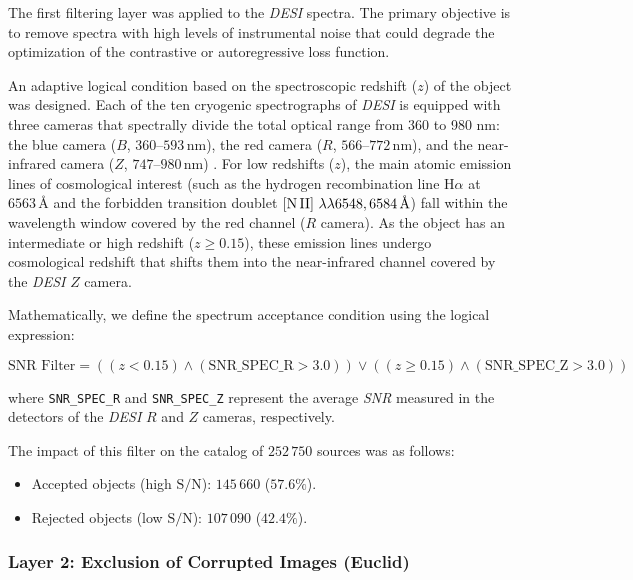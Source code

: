 The first filtering layer was applied to the \textit{\gls{DESI}} spectra. The primary objective is to remove spectra with high levels of instrumental noise that could degrade the optimization of the contrastive or autoregressive loss function.

An adaptive logical condition based on the spectroscopic redshift ($z$) of the object was designed. Each of the ten cryogenic spectrographs of \textit{\gls{DESI}} is equipped with three cameras that spectrally divide the total optical range from 360 to 980 nm: the blue camera ($B$, $360\text{--}593\,\text{nm}$), the red camera ($R$, $566\text{--}772\,\text{nm}$), and the near-infrared camera ($Z$, $747\text{--}980\,\text{nm}$) \autocite{ar:abareshi-2022}. For low redshifts ($z$), the main atomic emission lines of cosmological interest (such as the hydrogen recombination line H$\alpha$ at $6563\,\text{\AA{}}$ and the forbidden transition doublet $\left[\text{N\,II}\right]\,\lambda\lambda 6548, 6584\,\text{\AA{}}$) fall within the wavelength window covered by the red channel ($R$ camera). As the object has an intermediate or high redshift ($z \ge 0.15$), these emission lines undergo cosmological redshift that shifts them into the near-infrared channel covered by the \textit{DESI} $Z$ camera.

Mathematically, we define the spectrum acceptance condition using the logical expression:

\begin{equation}
\text{SNR Filter} = \left( \left(z < 0.15\right) \wedge \left(\text{SNR\_SPEC\_R} > 3.0\right) \right) \vee \left( \left(z \ge 0.15\right) \wedge \left(\text{SNR\_SPEC\_Z} > 3.0\right) \right)
\label{eq:filtro_snr}
\end{equation}

where \texttt{SNR\_SPEC\_R} and \texttt{SNR\_SPEC\_Z} represent the average \textit{\gls{SNR}} measured in the detectors of the \textit{\gls{DESI}} $R$ and $Z$ cameras, respectively.

The impact of this filter on the catalog of $252\,750$ sources was as follows:

\begin{itemize}
\item Accepted objects (high $\text{S/N}$): $145\,660$ ($57.6\%$).
\item Rejected objects (low $\text{S/N}$): $107\,090$ ($42.4\%$).
\end{itemize}

\subsubsection{Layer 2: Exclusion of Corrupted Images (Euclid)}

